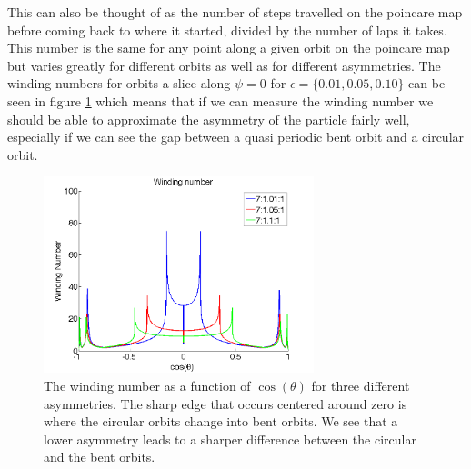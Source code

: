 This can also be thought of as the number of steps travelled on the poincare map before coming back to where it 
started, divided by the number of laps it takes. This number is the same for any point along a given orbit on the 
poincare map but varies greatly for different orbits as well as for different asymmetries. The winding numbers for
 orbits a slice along $\psi=0$ for $\epsilon=\{0.01, 0.05, 0.10\}$ can be seen in figure \ref{fig:windingdifferent} which means that if we can measure the winding number we should be able to approximate the asymmetry of the particle fairly well, especially if we can see the gap between a quasi periodic bent orbit and a circular orbit.
 
\begin{figure}[H]
\begin{center}
\includegraphics[width=0.7\textwidth]{figures/theory/WindingTrend.png}
\end{center}
\caption{The winding number as a function of $\cos(\theta)$ for three different asymmetries. The sharp edge that occurs centered around zero is where the circular orbits change into bent orbits. We see that a lower asymmetry leads to a sharper difference between the circular and the bent orbits.}
\label{fig:windingdifferent}
\end{figure}
